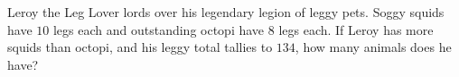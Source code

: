 Leroy the Leg Lover lords over his legendary legion of leggy pets. Soggy squids have $10$ legs each and outstanding octopi have $8$ legs each. If Leroy has more squids than octopi, and his leggy total tallies to $134$, how many animals does he have?
